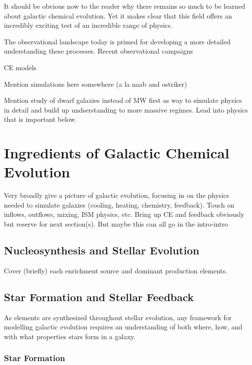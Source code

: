  It should be obvious now to the reader why there remains so much to be learned about galactic chemical evolution. Yet it makes clear that this field offers an incredibly exciting test of an incredible range of physics.

The observational landscape today is primed for developing a more detailed understanding these processes. Recent observational campaigns 

CE models

Mention simulations here somewhere (a la naab and ostriker)


Mention study of dwarf galaxies instead of MW first as way to simulate physics in detail and build up undserstanding to more massive regimes. Lead into physics that is important below.


\section{Ingredients of Galactic Chemical Evolution}

Very broadly give a picture of galactic evolution, focusing in on the physics needed to simulate galaxies (cooling, heating, chemistry, feedback). Touch on inflows, outflows, mixing, ISM physics, etc. Bring up CE and feedback obviously but reserve for next section(s). But maybe this can all go in the intro-intro

\subsection{Nucleosynthesis and Stellar Evolution}

Cover (briefly) each enrichment source and dominant production elements. 


\subsection{Star Formation and Stellar Feedback}\label{sec:section1}

As elements are synthesized throughout stellar evolution, any framework for modelling galactic evolution requires an understanding of both where, how, and with what properties stars form in a galaxy. 

\subsubsection{Star Formation}

